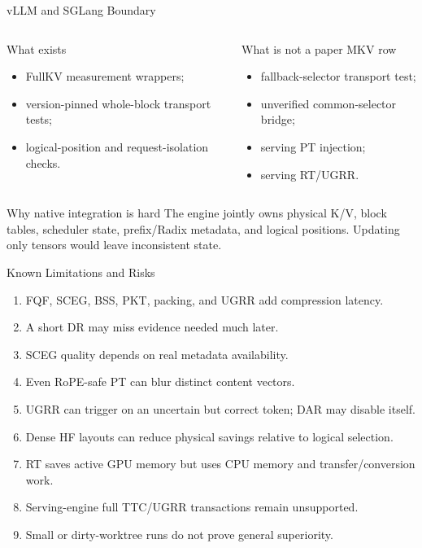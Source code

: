 \documentclass[aspectratio=169,10pt]{beamer}
\newcommand{\tightitems}{\setlength{\itemsep}{0.28em}\setlength{\parskip}{0pt}}
\begin{document}
\begin{frame}{vLLM and SGLang Boundary}
\small
\begin{columns}[T,onlytextwidth]
\begin{block}{What exists}
\begin{itemize}\tightitems
  \item FullKV measurement wrappers;
  \item version-pinned whole-block transport tests;
  \item logical-position and request-isolation checks.
\end{itemize}
\end{block}
\begin{alertblock}{What is not a paper MKV row}
\begin{itemize}\tightitems
  \item fallback-selector transport test;
  \item unverified common-selector bridge;
  \item serving PT injection;
  \item serving RT/UGRR.
\end{itemize}
\end{alertblock}
\end{columns}
\begin{block}{Why native integration is hard}
The engine jointly owns physical K/V, block tables, scheduler state, prefix/Radix metadata, and
logical positions. Updating only tensors would leave inconsistent state.
\end{block}
\end{frame}

\begin{frame}{Known Limitations and Risks}
\scriptsize
\begin{enumerate}\tightitems
  \item FQF, SCEG, BSS, PKT, packing, and UGRR add compression latency.
  \item A short DR may miss evidence needed much later.
  \item SCEG quality depends on real metadata availability.
  \item Even RoPE-safe PT can blur distinct content vectors.
  \item UGRR can trigger on an uncertain but correct token; DAR may disable itself.
  \item Dense HF layouts can reduce physical savings relative to logical selection.
  \item RT saves active GPU memory but uses CPU memory and transfer/conversion work.
  \item Serving-engine full TTC/UGRR transactions remain unsupported.
  \item Small or dirty-worktree runs do not prove general superiority.
\end{enumerate}
\end{frame}
\end{document}
